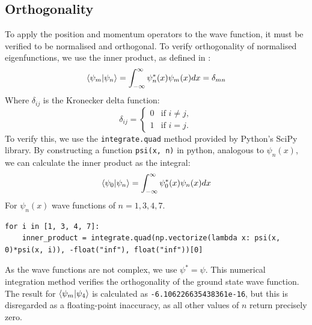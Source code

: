 \documentclass[a4paper]{article}
\begin{document}
\subsection{Orthogonality}
To apply the position and momentum operators to the wave function, it must be verified to be normalised and orthogonal. To verify orthogonality of normalised eigenfunctions, we use the inner product, as defined in \cite[\S3.1.2$\sim$p.25]{RefWorks:doc:60607bf68f08266f5a4c455d}:
\begin{equation}
\bra{\psi_m} \ket{\psi_n} =\int^\infty_{-\infty}\psi^*_n(x)\psi_m(x)dx = \delta_{mn}
\end{equation}
Where $\delta_{ij}$ is the Kronecker delta function:
\begin{equation}
{\displaystyle \delta _{ij}={\begin{cases}0&{\text{if }}i\neq j,\\1&{\text{if }}i=j.\end{cases}}}
\end{equation}
To verify this, we use the \lstinline$integrate.quad$ method provided by Python's SciPy library. By constructing a function \lstinline$psi(x, n)$ in python, analogous to $\psi_n(x)$, we can calculate the inner product as the integral:
\begin{equation}
\bra{\psi_0} \ket{\psi_n}=\int^\infty_{-\infty}\psi_0^*(x)\psi_n(x)dx
\end{equation}
For $\psi_n(x)$ wave functions of $n=1, 3, 4, 7$.
\begin{lstlisting}
for i in [1, 3, 4, 7]:
    inner_product = integrate.quad(np.vectorize(lambda x: psi(x, 0)*psi(x, i)), -float("inf"), float("inf"))[0]
\end{lstlisting} As the wave functions are not complex, we use $\psi^*=\psi$. This numerical integration method verifies the orthogonality of the ground state wave function. The result for $\bra{\psi_m} \ket{\psi_4}$ is calculated as \lstinline$-6.106226635438361e-16$, but this is disregarded as a floating-point inaccuracy, as all other values of $n$ return precisely zero.
\end{document}
